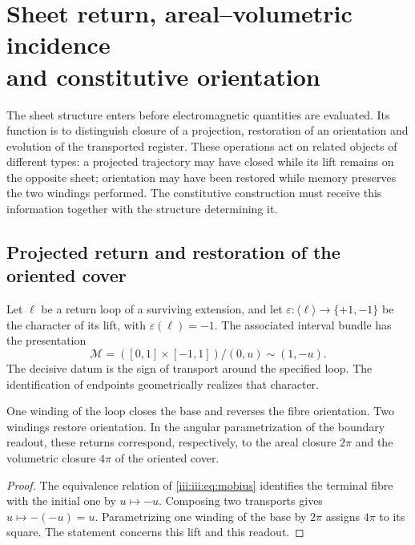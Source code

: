 \section[Sheet return, areal--volumetric incidence and constitutive orientation]{Sheet return, areal--volumetric incidence\\and constitutive orientation}
\label{iii:iii:sec:hojas}

The sheet structure enters before electromagnetic quantities
are evaluated. Its function is to distinguish closure of a projection,
restoration of an orientation and evolution of the transported register.
These operations act on related objects of different types: a
projected trajectory may have closed while its lift remains
on the opposite sheet; orientation may have been restored while memory
preserves the two windings performed. The constitutive construction must receive
this information together with the structure determining it.

\subsection{Projected return and restoration of the oriented cover}

Let $\ell$ be a return loop of a surviving extension, and let
$\varepsilon:\langle\ell\rangle\to\{+1,-1\}$ be the character of its
lift, with $\varepsilon(\ell)=-1$. The associated interval bundle
has the presentation
\begin{equation}
 \mathcal M=([0,1]\times[-1,1])/{(0,u)\sim(1,-u)}.
 \label{iii:iii:eq:mobius}
\end{equation}
The decisive datum is the sign of transport around the specified loop. The
identification of endpoints geometrically realizes that character.

\begin{proposition}
One winding of the loop closes the base and reverses the fibre orientation. Two
windings restore orientation. In the angular parametrization of the boundary
readout, these returns correspond, respectively, to the areal closure $2\pi$ and
the volumetric closure $4\pi$ of the oriented cover.
\end{proposition}
\begin{proof}
The equivalence relation of \eqref{iii:iii:eq:mobius} identifies the terminal fibre
with the initial one by $u\mapsto-u$. Composing two transports gives
$u\mapsto-(-u)=u$. Parametrizing one winding of the base by $2\pi$ assigns $4\pi$
to its square. The statement concerns this lift and this readout.
\end{proof}

